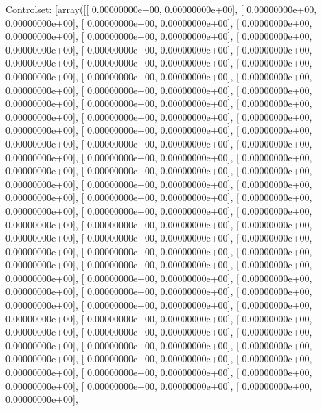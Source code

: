 \documentclass{article}
\begin{document}
Controlset: [array([[  0.00000000e+00,   0.00000000e+00],
       [  0.00000000e+00,   0.00000000e+00],
       [  0.00000000e+00,   0.00000000e+00],
       [  0.00000000e+00,   0.00000000e+00],
       [  0.00000000e+00,   0.00000000e+00],
       [  0.00000000e+00,   0.00000000e+00],
       [  0.00000000e+00,   0.00000000e+00],
       [  0.00000000e+00,   0.00000000e+00],
       [  0.00000000e+00,   0.00000000e+00],
       [  0.00000000e+00,   0.00000000e+00],
       [  0.00000000e+00,   0.00000000e+00],
       [  0.00000000e+00,   0.00000000e+00],
       [  0.00000000e+00,   0.00000000e+00],
       [  0.00000000e+00,   0.00000000e+00],
       [  0.00000000e+00,   0.00000000e+00],
       [  0.00000000e+00,   0.00000000e+00],
       [  0.00000000e+00,   0.00000000e+00],
       [  0.00000000e+00,   0.00000000e+00],
       [  0.00000000e+00,   0.00000000e+00],
       [  0.00000000e+00,   0.00000000e+00],
       [  0.00000000e+00,   0.00000000e+00],
       [  0.00000000e+00,   0.00000000e+00],
       [  0.00000000e+00,   0.00000000e+00],
       [  0.00000000e+00,   0.00000000e+00],
       [  0.00000000e+00,   0.00000000e+00],
       [  0.00000000e+00,   0.00000000e+00],
       [  0.00000000e+00,   0.00000000e+00],
       [  0.00000000e+00,   0.00000000e+00],
       [  0.00000000e+00,   0.00000000e+00],
       [  0.00000000e+00,   0.00000000e+00],
       [  0.00000000e+00,   0.00000000e+00],
       [  0.00000000e+00,   0.00000000e+00],
       [  0.00000000e+00,   0.00000000e+00],
       [  0.00000000e+00,   0.00000000e+00],
       [  0.00000000e+00,   0.00000000e+00],
       [  0.00000000e+00,   0.00000000e+00],
       [  0.00000000e+00,   0.00000000e+00],
       [  0.00000000e+00,   0.00000000e+00],
       [  0.00000000e+00,   0.00000000e+00],
       [  0.00000000e+00,   0.00000000e+00],
       [  0.00000000e+00,   0.00000000e+00],
       [  0.00000000e+00,   0.00000000e+00],
       [  0.00000000e+00,   0.00000000e+00],
       [  0.00000000e+00,   0.00000000e+00],
       [  0.00000000e+00,   0.00000000e+00],
       [  0.00000000e+00,   0.00000000e+00],
       [  0.00000000e+00,   0.00000000e+00],
       [  0.00000000e+00,   0.00000000e+00],
       [  0.00000000e+00,   0.00000000e+00],
       [  0.00000000e+00,   0.00000000e+00],
       [  0.00000000e+00,   0.00000000e+00],
       [  0.00000000e+00,   0.00000000e+00],
       [  0.00000000e+00,   0.00000000e+00],
       [  0.00000000e+00,   0.00000000e+00],
       [  0.00000000e+00,   0.00000000e+00],
       [  0.00000000e+00,   0.00000000e+00],
       [  0.00000000e+00,   0.00000000e+00],
       [  0.00000000e+00,   0.00000000e+00],
\end{document}
